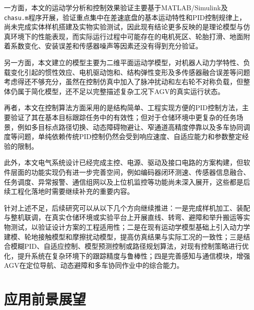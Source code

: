 {{一方面，本文的运动学分析和控制效果验证主要基于MATLAB/Simulink及\texttt{chasu.m}程序开展，验证重点集中在差速底盘的基本运动特性和PID控制规律上，尚未完成实体样机搭建及实物实验测试，因此现有结论更多反映的是理论模型与仿真环境下的性能表现，而实际运行过程中可能存在的电机死区、轮胎打滑、地面附着系数变化、安装误差和传感器噪声等因素还没有得到充分验证。

另一方面，本文建立的模型主要为二维平面运动学模型，对机器人动力学特性、负载变化引起的惯性效应、电机驱动饱和、结构弹性变形及多传感器融合误差等问题考虑得还不够充分，虽然在控制仿真中加入了脉冲扰动和左右轮不对称负载，但整体仍属于简化模型，还不足以完整描述复杂工况下AGV的真实运行状态。

再者，本文在控制算法方面采用的是结构简单、工程实现方便的PID控制方法，主要验证了其在基本目标跟踪任务中的有效性；但对于仓储环境中更复杂的任务场景，例如多目标点路径切换、动态障碍物避让、窄通道高精度停靠以及多车协同调度等问题，单纯依赖传统PID控制仍然会受到响应速度、自适应能力和参数整定经验的限制。

此外，本文电气系统设计已经完成主控、电源、驱动及接口电路的方案构建，但软件层面的功能实现仍有进一步完善空间，例如编码器闭环测速、传感器信息融合、任务调度、异常报警、通信组网以及上位机监控等功能尚未深入展开，这些都是后续工程化落地时需要继续补充的重要内容。

针对上述不足，后续研究可以从以下几个方向继续推进：一是完成样机加工、装配与整机联调，在真实仓储环境或实验平台上开展直线、转弯、避障和举升搬运等实物测试，以验证设计方案的工程适用性；二是在现有运动学模型基础上引入动力学建模、轮地接触模型和摩擦扰动模型，提高仿真结果与实际工况的一致性；三是结合模糊PID、自适应控制、模型预测控制或路径规划算法，对现有控制策略进行优化，提升系统在复杂环境下的跟踪精度与鲁棒性；四是完善感知与通信模块，增强AGV在定位导航、动态避障和多车协同作业中的综合能力。

}
    \section{应用前景展望}
    }

